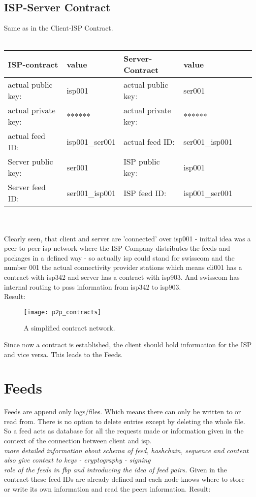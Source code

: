 \subsection{ISP-Server Contract}
Same as in the Client-ISP Contract.\\\\
\begin{tabular}{llllll} \toprule
    ISP-contract&value&Server-Contract&value\\ \midrule
    actual public key:& isp001 &  actual public key: &ser001   \\ 
    actual private key:& ****** & actual private key:& ******  \\
    actual feed ID:& isp001\_ser001 &actual feed ID:&ser001\_isp001\\ 
    Server public key:&ser001&ISP public key:&isp001\\
    Server feed ID:&ser001\_isp001&ISP feed ID:&isp001\_ser001\\\bottomrule
\end{tabular}
\\\\
Clearly seen, that client and server are 'connected' over isp001 - initial idea was a peer to peer isp network where the ISP-Company distributes the feeds and packages in a defined way - so actually isp could stand for swisscom and the number 001 the actual connectivity provider stations which means cli001 has a contract with isp342 and server has a contract with isp903. And swisscom has internal routing to pass information from isp342 to isp903.
\\
Result:

\begin{figure}
    \centering
    \texttt{[image: p2p\_contracts]}
    \caption{A simplified contract network.}
    \label{fig:contract_network}
\end{figure}



Since now a contract is established, the client should hold information for the ISP and vice versa. This leads to the Feeds.

\pagebreak

\section{Feeds}
Feeds are append only logs/files. Which means there can only be written to or read from. There is no option to delete entries except by deleting the whole file. So a feed acts as database for all the requests made or information given in the context of the connection between client and isp.\\
\textit{more detailed information about schema of feed, hashchain, sequence and content}\\
\textit{also give context to keys - cryptography - signing}\\
\textit{role of the feeds in fbp and introducing the idea of feed pairs.}
Given in the contract these feed IDs are already defined and each node knows where to store or write its own information and read the peers information.
Result:

